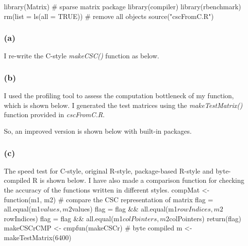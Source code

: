 \documentclass{article}
\begin{document}
library(Matrix) # sparse matrix package
library(compiler)
library(rbenchmark)
rm(list = ls(all = TRUE)) # remove all objects
source("cscFromC.R")

\subsubsection*{(a)}
I re-write the C-style \textit{makeCSC()} function as below.


\subsubsection*{(b)}
I used the profiling tool to assess the computation bottleneck of my function, which is shown below.
I generated the test matrices using the \textit{makeTestMatrix()} function provided in \textit{cscFromC.R}.


So, an improved version is shown below with built-in packages.

\subsubsection*{(c)}
The speed test for C-style, original R-style, package-based R-style and byte-compiled R is shown below.
I have also made a comparison function for checking the accuracy of the functions written in different styles.
compMat <- function(m1, m2){ # compare the CSC representation of matrix
	flag = all.equal(m1$values, m2$values)
	flag = flag && all.equal(m1$rowIndices, m2$rowIndices)
	flag = flag && all.equal(m1$colPointers, m2$colPointers)
	return(flag)
}
makeCSCrCMP <- cmpfun(makeCSCr) # byte compiled
m <- makeTestMatrix(6400)
\end{document}
